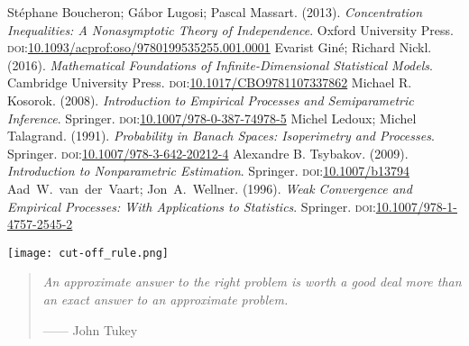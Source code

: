 \documentclass[11pt, a3paper, openany]{article}
\theoremstyle{remark}
\theoremstyle{remark}
\theoremstyle{remark}
\newenvironment{Proof of claim}
  {\begin{proof}[\normalfont \textbf{Proof of claim}]}
  {\end{proof}}
\begin{document}
\begin{thebibliography}{}
{\small
 St\'{e}phane Boucheron; G\'{a}bor Lugosi; Pascal Massart. (2013). \emph{Concentration Inequalities: A Nonasymptotic Theory of Independence}. Oxford University Press. \textsc{doi}:\href{https://doi.org/10.1093/acprof:oso/9780199535255.001.0001}{10.1093/acprof:oso/9780199535255.001.0001}
 Evarist Gin\'{e}; Richard Nickl. (2016). \emph{Mathematical Foundations of Infinite-Dimensional Statistical Models}. Cambridge University Press. \textsc{doi}:\href{https://doi.org/10.1017/CBO9781107337862}{10.1017/CBO9781107337862}
 Michael R. Kosorok. (2008). \emph{Introduction to Empirical Processes and Semiparametric Inference}. Springer. \textsc{doi}:\href{https://doi.org/10.1007/978-0-387-74978-5}{10.1007/978-0-387-74978-5}
 Michel Ledoux; Michel Talagrand. (1991). \emph{Probability in Banach Spaces: Isoperimetry and Processes}. Springer. \textsc{doi}:\href{https://doi.org/10.1007/978-3-642-20212-4}{10.1007/978-3-642-20212-4}
 Alexandre B. Tsybakov. (2009). \emph{Introduction to Nonparametric Estimation}. Springer. \textsc{doi}:\href{https://doi.org/10.1007/b13794}{10.1007/b13794}
 Aad~W.~van~der~Vaart; Jon~A.~Wellner. (1996). \emph{Weak Convergence and Empirical Processes: With Applications to Statistics}. Springer. \textsc{doi}:\href{https://doi.org/10.1007/978-1-4757-2545-2}{10.1007/978-1-4757-2545-2}
}
\end{thebibliography}
\begingroup
\renewcommand{\color}[1]{}
\listoffigures
\endgroup
\vspace{3ex}
\begin{center}
	\texttt{[image: cut-off\_rule.png]}
\end{center}
\vspace{1ex}
\begin{quotation}
	\textsl{An approximate answer to the right problem is worth a good deal more than an exact answer to an approximate problem.}
	
\hfill ------ John Tukey
\end{quotation}
\end{document}
